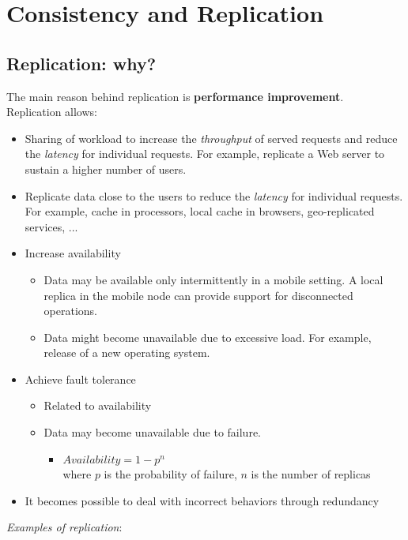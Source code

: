 \documentclass[10pt,a4paper]{article}
\begin{document}
\section{\LARGE Consistency and Replication}
\subsection{Replication: why?}
The main reason behind replication is \textbf{performance improvement}. \\
Replication allows:
\begin{itemize}
	\item Sharing of workload to increase the \textit{throughput} of served requests and reduce the \textit{latency} for individual requests. For example, replicate a Web server to sustain a higher number of users.
	\item Replicate data close to the users to reduce the \textit{latency} for individual requests. For example, cache in processors, local cache in browsers, geo-replicated services, ...
	\item Increase availability
	\begin{itemize}
		\item Data may be available only intermittently in a mobile setting. A local replica in the mobile node can provide support for disconnected operations.
		\item Data might become unavailable due to excessive load. For example, release of a new operating system.
	\end{itemize}
	\item Achieve fault tolerance
	\begin{itemize}
		\item Related to availability
		\item Data may become unavailable due to failure. 
		\begin{itemize}
			\item $Availability = 1-p^n $\\ where $p$ is the probability of failure, $n$ is the number of replicas
		\end{itemize}
	\end{itemize}
	\item It becomes possible to deal with incorrect behaviors through redundancy
\end{itemize}
\textit{Examples of replication}:
\end{document}
